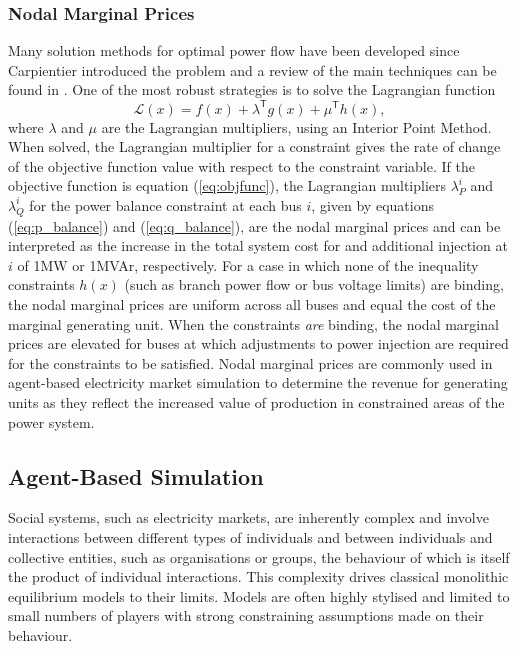 \subsubsection{Nodal Marginal Prices}
Many solution methods for optimal power flow have been developed
since Carpientier introduced the problem and a review of the main techniques
can be found in .  One of the most robust
strategies is to solve the Lagrangian function
\begin{equation}
\mathcal{L}(x) = f(x) + \lambda^\mathsf{T}g(x) + \mu^\mathsf{T}h(x),
\end{equation}
where $\lambda$ and $\mu$ are the Lagrangian multipliers, using an Interior
Point Method.  When solved, the Lagrangian multiplier for a constraint gives
the rate of change of the objective function value with respect to the
constraint variable.  If the objective function is equation (\ref{eq:objfunc}), the Lagrangian
multipliers $\lambda^i_P$ and $\lambda^i_Q$ for the power balance constraint at
each bus $i$, given by equations (\ref{eq:p_balance}) and (\ref{eq:q_balance}),
are the nodal marginal prices and can be interpreted as the increase in the
total system cost for and additional injection at $i$ of 1MW or 1MVAr,
respectively.  For a case in which none of the inequality constraints $h(x)$
(such as branch power flow or bus voltage limits) are binding, the nodal
marginal prices are uniform across all buses and equal the cost of the
marginal generating unit.  When the constraints \textit{are} binding, the nodal
marginal prices are elevated for buses at which adjustments to power injection
are required for the constraints to be satisfied.  Nodal marginal prices are
commonly used in agent-based electricity market simulation to determine the
revenue for generating units as they reflect the increased value of production in
constrained areas of the power system.

\subsection{Agent-Based Simulation}
Social systems, such as electricity markets, are inherently complex and involve
interactions between different types of individuals and between individuals
and collective entities, such as organisations or groups, the behaviour of which
is itself the product of individual interactions.  This complexity
drives classical monolithic equilibrium models to their limits.  Models are
often highly stylised and limited to small numbers of players with strong
constraining assumptions made on their behaviour.

